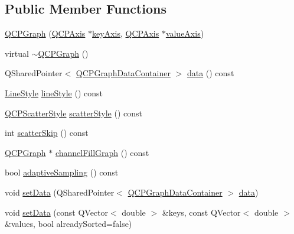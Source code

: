 \subsection*{Public Member Functions}
\begin{DoxyCompactItemize}
\item 
\mbox{\hyperlink{class_q_c_p_graph_a0393a38cf7183cbf46348eb6cf9a5a6c}{Q\+C\+P\+Graph}} (\mbox{\hyperlink{class_q_c_p_axis}{Q\+C\+P\+Axis}} $\ast$\mbox{\hyperlink{class_q_c_p_abstract_plottable_a2cdd6f0dd5e9a979037f86b4000d9cfe}{key\+Axis}}, \mbox{\hyperlink{class_q_c_p_axis}{Q\+C\+P\+Axis}} $\ast$\mbox{\hyperlink{class_q_c_p_abstract_plottable_af47809a644a68ffd955fb30b01fb4f2f}{value\+Axis}})
\item 
virtual \mbox{\hyperlink{class_q_c_p_graph_ae9998cfb9d379ac0ef3fbd6995cfbd76}{$\sim$\+Q\+C\+P\+Graph}} ()
\item 
Q\+Shared\+Pointer$<$ \mbox{\hyperlink{qcustomplot_8h_a2e5583d1ae212f0deb10537cf975a15a}{Q\+C\+P\+Graph\+Data\+Container}} $>$ \mbox{\hyperlink{class_q_c_p_graph_a141aa31a1f19bbd0ce60f55eaeb9ea60}{data}} () const
\item 
\mbox{\hyperlink{class_q_c_p_graph_ad60175cd9b5cac937c5ee685c32c0859}{Line\+Style}} \mbox{\hyperlink{class_q_c_p_graph_ac3e6f4b3387338df45992b47691b2551}{line\+Style}} () const
\item 
\mbox{\hyperlink{class_q_c_p_scatter_style}{Q\+C\+P\+Scatter\+Style}} \mbox{\hyperlink{class_q_c_p_graph_a36d5b641db08e27527827c212542bbbd}{scatter\+Style}} () const
\item 
int \mbox{\hyperlink{class_q_c_p_graph_a44487a3a706605bb9fc97ad5e05d347e}{scatter\+Skip}} () const
\item 
\mbox{\hyperlink{class_q_c_p_graph}{Q\+C\+P\+Graph}} $\ast$ \mbox{\hyperlink{class_q_c_p_graph_a84277b1655474453a5c83318053414d5}{channel\+Fill\+Graph}} () const
\item 
bool \mbox{\hyperlink{class_q_c_p_graph_a1ba934b9621270b9a40fcdd2d9ba2adb}{adaptive\+Sampling}} () const
\item 
void \mbox{\hyperlink{class_q_c_p_graph_a1eae9429a316b008e2d99b2d65a54395}{set\+Data}} (Q\+Shared\+Pointer$<$ \mbox{\hyperlink{qcustomplot_8h_a2e5583d1ae212f0deb10537cf975a15a}{Q\+C\+P\+Graph\+Data\+Container}} $>$ \mbox{\hyperlink{class_q_c_p_graph_a141aa31a1f19bbd0ce60f55eaeb9ea60}{data}})
\item 
void \mbox{\hyperlink{class_q_c_p_graph_a73578d786532132310a926c3cd529b29}{set\+Data}} (const Q\+Vector$<$ double $>$ \&keys, const Q\+Vector$<$ double $>$ \&values, bool already\+Sorted=false)

\end{DoxyCompactItemize}

